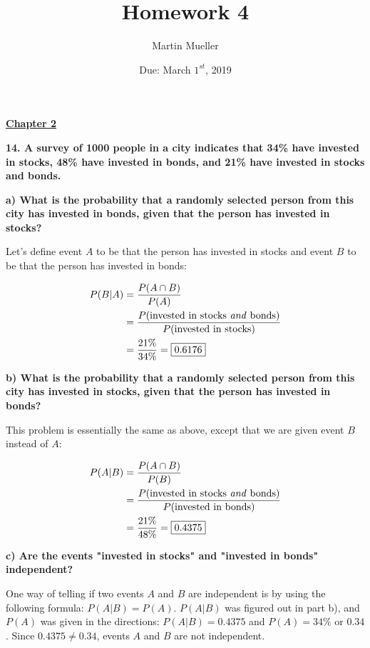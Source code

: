 \documentclass[12pt, letterpaper]{article}
\title{Homework 4}
\author{Martin Mueller}
\date{Due: March $1^{st}$, 2019}
\begin{document}
\maketitle

\begin{center}
	\underline{\textbf{Chapter 2}}
\end{center}

\textbf{14. A survey of 1000 people in a city indicates that 34\% have invested in stocks, 48\% have invested in bonds, and 21\% have invested in stocks and bonds.}

\qquad \textbf{a) What is the probability that a randomly selected person from this city has invested in bonds, given that the person has invested in stocks?}

\begin{center}
	Let's define event $A$ to be that the person has invested in stocks and event $B$ to be that the person has invested in bonds:
\end{center}
\begin{align*}
	P(B|A) &= \frac{P(A \cap B)}{P(A)} \\
	&= \frac{P(\text{invested in stocks \textit{and} bonds})}{P(\text{invested in stocks})} \\
	&= \frac{21\%}{34\%} = \boxed{0.6176}
\end{align*}

\pagebreak

\qquad \textbf{b) What is the probability that a randomly selected person from this city has invested in stocks, given that the person has invested in bonds?}

\begin{center}
	This problem is essentially the same as above, except that we are given event $B$ instead of $A$:
\end{center}
\begin{align*}
	P(A|B) &= \frac{P(A \cap B)}{P(B)} \\
	&= \frac{P(\text{invested in stocks \textit{and} bonds})}{P(\text{invested in bonds})} \\
	&= \frac{21\%}{48\%} = \boxed{0.4375}
\end{align*}

\qquad \textbf{c) Are the events "invested in stocks" and "invested in bonds" independent?}

\begin{center}
	One way of telling if two events $A$ and $B$ are independent is by using the following formula: $P(A|B) = P(A)$. $P(A|B)$ was figured out in part b), and $P(A)$ was given in the directions: $P(A|B) = 0.4375$ and $P(A) = 34\% \text{ or } 0.34$. Since $0.4375 \neq 0.34$, events $A$ and $B$ are not independent.
\end{center}
\end{document}
